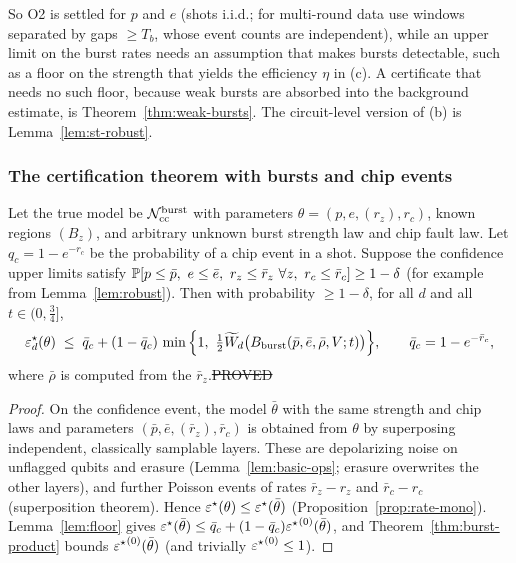 \noindent So O2 is settled for $p$ and $e$ (shots i.i.d.; for multi-round data use windows separated by gaps $\ge T_b$, whose event counts are independent), while an upper limit on the burst rates needs an assumption that makes bursts detectable, such as a floor on the strength that yields the efficiency $\eta$ in (c). A certificate that needs no such floor, because weak bursts are absorbed into the background estimate, is Theorem~\ref{thm:weak-bursts}. The circuit-level version of (b) is Lemma~\ref{lem:st-robust}.

\subsubsection*{The certification theorem with bursts and chip events}

\begin{theorem}\label{thm:burst-cert}
Let the true model be $\mathcal{N}_{\rm cc}^{\rm burst}$ with parameters $\theta=(p,e,(r_z),r_c)$, known regions $(B_z)$, and arbitrary unknown burst strength law and chip fault law. Let $q_c=1-e^{-r_c}$ be the probability of a chip event in a shot.
Suppose the confidence upper limits satisfy $\Prob[p\le\bar p,\ e\le\bar e,\ r_z\le\bar r_z\ \forall z,\ r_c\le\bar r_c]\ge1-\delta$ (for example from Lemma~\ref{lem:robust}). Then with probability $\ge1-\delta$, for all $d$ and all $t\in(0,\tfrac34]$,
\[
\varepsilon^{\star}_d(\theta)\;\le\;\bar q_c+(1-\bar q_c)\,\min\Big\{1,\ \tfrac12\widetilde W_d\big(B_{\rm burst}(\bar p,\bar e,\bar\rho,V;t)\big)\Big\},
\qquad\bar q_c=1-e^{-\bar r_c},
\]
where $\bar\rho$ is computed from the $\bar r_z$.\hfill\st{PROVED}
\end{theorem}
\begin{proof}
On the confidence event, the model $\bar\theta$ with the same strength and chip laws and parameters $(\bar p,\bar e,(\bar r_z),\bar r_c)$ is obtained from $\theta$ by superposing independent, classically samplable layers. These are depolarizing noise on unflagged qubits and erasure (Lemma~\ref{lem:basic-ops}; erasure overwrites the other layers), and further Poisson events of rates $\bar r_z-r_z$ and $\bar r_c-r_c$ (superposition theorem).
Hence $\varepsilon^{\star}(\theta)\le\varepsilon^{\star}(\bar\theta)$ (Proposition~\ref{prop:rate-mono}). Lemma~\ref{lem:floor} gives $\varepsilon^{\star}(\bar\theta)\le\bar q_c+(1-\bar q_c){\varepsilon^{\star}}^{(0)}(\bar\theta)$, and Theorem~\ref{thm:burst-product} bounds ${\varepsilon^{\star}}^{(0)}(\bar\theta)$ (and trivially ${\varepsilon^{\star}}^{(0)}\le1$).
\end{proof}

